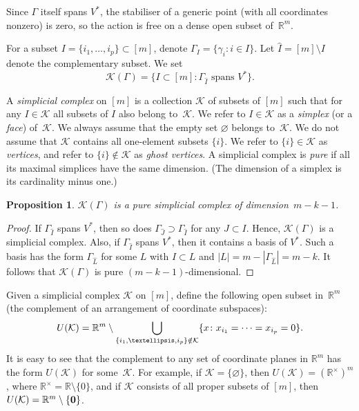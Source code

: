 \documentclass[a4paper]{amsart}
\newtheorem{proposition}[theorem]{Proposition}
\theoremstyle{definition}
\theoremstyle{remark}
\numberwithin{equation}{section}
\def\R{\mathbb R}
\def\R{\mathbb R}
\def\sK{\mathcal K}
\newcommand{\mb}[1]{{\textbf {\textit#1}}}
\newcommand{\<}{\langle}
\renewcommand{\>}{\rangle}
\begin{document}
Since $\Gamma$ itself spans $V^*$, the stabiliser of a generic point (with all coordinates nonzero) is zero, so the action is free on a dense open subset 
of~$\R^m$.

For a subset $I=\{i_1,\ldots,i_p\}\subset[m]$, denote 
$\Gamma_I=\{\gamma_i\colon i\in I\}$.
Let $\widehat I= [m]\setminus I$ denote the complementary subset. We set
\[
  \mathcal K(\Gamma)=\{I\subset[m]\colon \Gamma_{\widehat I}\text{ spans }V^*\}.
\]

A \emph{simplicial complex} on $[m]$ is a collection $\sK$ of subsets of $[m]$ such that
for any $I\in\sK$ all subsets of $I$ also belong to~$\sK$. We refer to $I\in\sK$ as a \emph{simplex} (or a \emph{face}) of~$\sK$. We
always assume that the empty set $\varnothing$ belongs to~$\sK$. We do not assume that $\sK$ contains all one-element subsets $\{i\}$. We refer to $\{i\}\in\sK$ as \emph{vertices}, and refer to $\{i\}\notin\sK$ as \emph{ghost vertices}. A simplicial complex is \emph{pure} if all its maximal simplices have the same dimension. (The dimension of a simplex is its cardinality minus one.)

\begin{proposition}
$\mathcal K(\Gamma)$ is a pure simplicial complex of dimension~$m-k-1$.
\end{proposition}
\begin{proof}
If $\Gamma_{\widehat I}$ spans $V^*$, then so does $\Gamma_{\widehat J}\supset\Gamma_{\widehat I}$ for any $J\subset I$. Hence, $\mathcal K(\Gamma)$ is a simplicial complex. Also, if $\Gamma_{\widehat I}$ spans $V^*$, then it contains a basis of $V^*$. Such a basis has the form $\Gamma_{\widehat L}$ for some $L$ with $I\subset L$ and $|L|=m-
|\Gamma_{\widehat L}|=m-k$. It follows that $\mathcal K(\Gamma)$ is pure $(m-k-1)$-dimensional.
\end{proof}

Given a simplicial complex $\mathcal K$ on $[m]$, define the following open subset in~$\R^m$ (the complement of an arrangement of coordinate subspaces):
\begin{equation}\label{UK}
  U(\mathcal K)=\R^m\setminus\bigcup_{\{i_1,\ldots,i_p\}\notin\mathcal K}
  \{\mb x\colon x_{i_1}=\cdots=x_{i_p}=0\}.
\end{equation}
It is easy to see that the complement to any set of coordinate planes in $\R^m$ has the form $U(\sK)$ for some~$\sK$.
For example, if $\sK=\{\varnothing\}$, then $U(\sK)=(\R^\times)^m$, where $\R^\times=\R\setminus\{0\}$, and if $\sK$ consists of all proper subsets of $[m]$, then $U(\sK)=\R^m\setminus\{\bf 0\}$.
\end{document}

